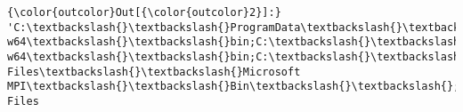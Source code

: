 \documentclass[11pt]{article}
\begin{document}
\begin{Verbatim}[commandchars=\\\{\}]
{\color{outcolor}Out[{\color{outcolor}2}]:} 'C:\textbackslash{}\textbackslash{}ProgramData\textbackslash{}\textbackslash{}Anaconda3\textbackslash{}\textbackslash{}Library\textbackslash{}\textbackslash{}bin;C:\textbackslash{}\textbackslash{}ProgramData\textbackslash{}\textbackslash{}Anaconda3\textbackslash{}\textbackslash{}Library\textbackslash{}\textbackslash{}bin;C:\textbackslash{}\textbackslash{}ProgramData\textbackslash{}\textbackslash{}Anaconda3\textbackslash{}\textbackslash{}Scripts;C:\textbackslash{}\textbackslash{}ProgramData\textbackslash{}\textbackslash{}Anaconda3\textbackslash{}\textbackslash{}Library\textbackslash{}\textbackslash{}bin;C:\textbackslash{}\textbackslash{}ProgramData\textbackslash{}\textbackslash{}Anaconda3;C:\textbackslash{}\textbackslash{}ProgramData\textbackslash{}\textbackslash{}Anaconda3\textbackslash{}\textbackslash{}Library\textbackslash{}\textbackslash{}mingw-w64\textbackslash{}\textbackslash{}bin;C:\textbackslash{}\textbackslash{}ProgramData\textbackslash{}\textbackslash{}Anaconda3\textbackslash{}\textbackslash{}Library\textbackslash{}\textbackslash{}usr\textbackslash{}\textbackslash{}bin;C:\textbackslash{}\textbackslash{}ProgramData\textbackslash{}\textbackslash{}Anaconda3\textbackslash{}\textbackslash{}Library\textbackslash{}\textbackslash{}bin;C:\textbackslash{}\textbackslash{}ProgramData\textbackslash{}\textbackslash{}Anaconda3\textbackslash{}\textbackslash{}Scripts;C:\textbackslash{}\textbackslash{}ProgramData\textbackslash{}\textbackslash{}Anaconda3\textbackslash{}\textbackslash{}bin;C:\textbackslash{}\textbackslash{}ProgramData\textbackslash{}\textbackslash{}Anaconda3\textbackslash{}\textbackslash{}Library\textbackslash{}\textbackslash{}bin;C:\textbackslash{}\textbackslash{}ProgramData\textbackslash{}\textbackslash{}Anaconda3;C:\textbackslash{}\textbackslash{}ProgramData\textbackslash{}\textbackslash{}Anaconda3\textbackslash{}\textbackslash{}Library\textbackslash{}\textbackslash{}mingw-w64\textbackslash{}\textbackslash{}bin;C:\textbackslash{}\textbackslash{}ProgramData\textbackslash{}\textbackslash{}Anaconda3\textbackslash{}\textbackslash{}Library\textbackslash{}\textbackslash{}usr\textbackslash{}\textbackslash{}bin;C:\textbackslash{}\textbackslash{}ProgramData\textbackslash{}\textbackslash{}Anaconda3\textbackslash{}\textbackslash{}Library\textbackslash{}\textbackslash{}bin;C:\textbackslash{}\textbackslash{}ProgramData\textbackslash{}\textbackslash{}Anaconda3\textbackslash{}\textbackslash{}Scripts;C:\textbackslash{}\textbackslash{}ProgramData\textbackslash{}\textbackslash{}Anaconda3\textbackslash{}\textbackslash{}Library\textbackslash{}\textbackslash{}bin;C:\textbackslash{}\textbackslash{}Program Files\textbackslash{}\textbackslash{}Microsoft MPI\textbackslash{}\textbackslash{}Bin\textbackslash{}\textbackslash{};C:\textbackslash{}\textbackslash{}Program Files 
\end{Verbatim}
\end{document}
